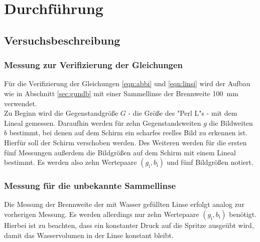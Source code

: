 \section{Durchführung}
\label{sec:Durchführung}



\subsection{Versuchsbeschreibung}
\label{sec:Versuchsbeschreibung}


\subsubsection{Messung zur Verifizierung der Gleichungen}

Für die Verifizierung der Gleichungen \eqref{eqn:abbi} und \eqref{eqn:linsi} wird der
Aufbau wie in Abschnitt \ref{sec:gundb} mit einer Sammellinse der Brennweite
\SI{100}{\milli\meter} verwendet.\\
Zu Beginn wird die Gegenstandgröße $G$ - die Größe des "Perl L"s - mit dem Lineal gemessen.
Daraufhin werden für zehn Gegenstandsweiten $g$ die Bildweiten $b$ bestimmt, bei denen auf dem
Schirm ein scharfes reelles Bild zu erkennen ist. Hierfür soll der Schirm verschoben werden.
Des Weiteren werden für die ersten fünf Messungen außerdem die Bildgrößen auf dem Schirm mit
einem Lineal bestimmt. Es werden also zehn Wertepaare $(g_{\mathrm{i}},b_{\mathrm{i}})$ und
fünf Bildgrößen notiert.

\subsubsection{Messung für die unbekannte Sammellinse}

Die Messung der Brennweite der mit Wasser gefüllten Linse erfolgt analog zur vorherigen
Messung. Es werden allerdings nur zehn Wertepaare $(g_{\mathrm{i}},b_{\mathrm{i}})$
benötigt.\\
Hierbei ist zu beachten, dass ein konstanter Druck auf die Spritze ausgeübt wird,
damit das Wasservolumen in der Linse konstant bleibt.

